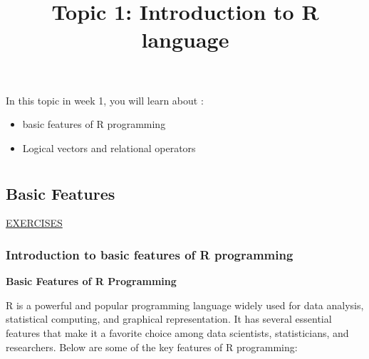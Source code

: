 \documentclass[
]{article}
\title{Topic 1: Introduction to R language}
\author{}
\date{\vspace{-2.5em}}
\providecommand{\tightlist}{%
  \setlength{\itemsep}{0pt}\setlength{\parskip}{0pt}}
\begin{document}
\maketitle

In this topic in week 1, you will learn about :

\begin{itemize}
\tightlist
\item
  basic features of R programming
\item
  Logical vectors and relational operators
\end{itemize}

\hypertarget{section}{%
\section{}\label{section}}

\hypertarget{basic-features}{%
\subsection{Basic Features}\label{basic-features}}

\href{https://ciksuriyati.shinyapps.io/penguins/?_ga=2.111118085.1242787491.1673712812-716303559.1673712812}{EXERCISES}

\hypertarget{introduction-to-basic-features-of-r-programming}{%
\subsubsection{Introduction to basic features of R
programming}\label{introduction-to-basic-features-of-r-programming}}

\textbf{Basic Features of R Programming}

R is a powerful and popular programming language widely used for data
analysis, statistical computing, and graphical representation. It has
several essential features that make it a favorite choice among data
scientists, statisticians, and researchers. Below are some of the key
features of R programming:
\end{document}
